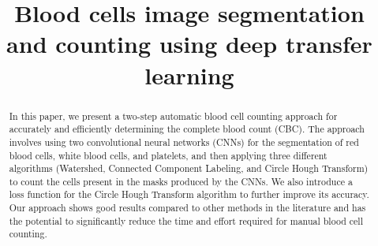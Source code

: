 \documentclass[conference]{IEEEtran}
\begin{document}
\title{Blood cells image segmentation and counting using deep transfer learning }

\author{
\and
{}
\and
{}
\and
{}
\and
{}
}
\maketitle
\vspace*{-0.8cm}
\begin{abstract}

In this paper, we present a two-step automatic blood cell counting approach for accurately and efficiently determining the complete blood count (CBC). The approach involves using two convolutional neural networks (CNNs) for the segmentation of red blood cells, white blood cells, and platelets, and then applying three different algorithms (Watershed, Connected Component Labeling, and Circle Hough Transform) to count the cells present in the masks produced by the CNNs. We also introduce a loss function for the Circle Hough Transform algorithm to further improve its accuracy. Our approach shows good results compared to other methods in the literature and has the potential to significantly reduce the time and effort required for manual blood cell counting.
\end{abstract}
\end{document}
